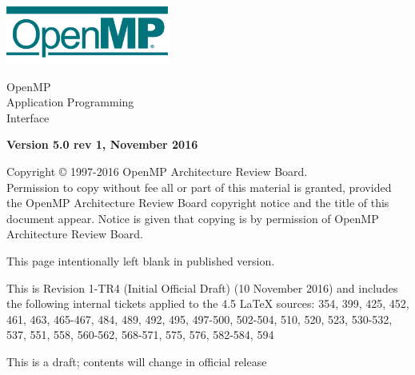 
  \begin{titlepage}
    \begin{flushleft}
     \hspace{-6em} \includegraphics[width=0.4\textwidth]{openmp-logo.png}
    \end{flushleft}

    \begin{adjustwidth}{-0.75in}{0in}
    \begin{center}
      \Huge
      \textsf{OpenMP\\Application Programming\\Interface}

      \vspace{0.5in}\textsf{    }\vspace{-0.7in}
      \normalsize

      \vspace{1.0in}

      \textbf{Version 5.0 rev 1, November 2016}
    \end{center}
    \end{adjustwidth}

    \vspace{3.0in}

\begin{adjustwidth}{0pt}{1em}\setlength{\parskip}{0.25\baselineskip}%
Copyright © 1997-2016 OpenMP Architecture Review Board.\\
Permission to copy without fee all or part of this material is granted,
provided the OpenMP Architecture Review Board copyright notice and
the title of this document appear. Notice is given that copying is by
permission of OpenMP Architecture Review Board.\end{adjustwidth}

  \end{titlepage}


\clearpage
\thispagestyle{empty}
\phantom{a}
This page intentionally left blank in published version.

This is Revision 1-TR4 (Initial Official Draft) (10 November 2016) and 
includes the following internal tickets applied to the 4.5 LaTeX sources: 
354, 399, 425, 452, 461, 463, 465-467, 484, 489, 492, 495, 497-500, 502-504,
510, 520, 523, 530-532, 537, 551, 558, 560-562, 568-571, 575, 576, 582-584, 
594

This is a draft; contents will change in official release

\vfill

